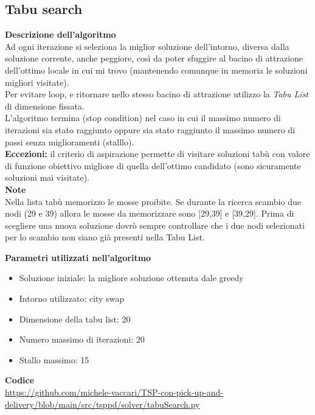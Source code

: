 \documentclass[9pt]{beamer}
\begin{document}
\subsection{Tabu search}
\begin{frame}{\subsecname}

	\textbf{Descrizione dell'algoritmo} \\
	Ad ogni iterazione si seleziona la miglior soluzione dell’intorno, diversa dalla soluzione corrente, anche peggiore, così da poter sfuggire al bacino di attrazione dell’ottimo locale in cui mi trovo (mantenendo comunque in memoria le soluzioni migliori visitate). \\
	Per evitare loop, e ritornare nello stesso bacino di attrazione utilizzo la \emph{Tabu List} di dimensione fissata. \\
	L’algoritmo termina (stop condition) nel caso in cui il massimo numero di iterazioni sia stato raggiunto oppure sia stato raggiunto il massimo numero di passi senza miglioramenti (stalllo). \\
	\textbf{Eccezioni:} il criterio di aspirazione permette di visitare soluzioni tabù con valore di funzione obiettivo migliore di quella dell’ottimo candidato (sono sicuramente soluzioni mai visitate). \\

\framebreak
	\textbf{Note} \\
	Nella lista tabù memorizzo le mosse proibite. Se durante la ricerca scambio due nodi (29 e 39) allora le mosse da memorizzare sono [29,39] e [39,29].
Prima di scegliere una nuova soluzione dovrò sempre controllare che i due nodi selezionati per lo scambio non siano già presenti nella Tabu List.

	\textbf{Parametri utilizzati nell'algoritmo}
	\begin{itemize}
		\item
		Soluzione iniziale: la migliore soluzione ottenuta dale greedy
		\item
		Intorno utilizzato: city swap
		\item
		Dimensione della tabu list: 20
		\item
		Numero massimo di iterazioni: 20
		\item
		Stallo massimo: 15
	\end{itemize}

	\textbf{Codice} \\
	\href{https://github.com/michele-vaccari/TSP-con-pick-up-and-delivery/blob/main/src/tsppd/solver/tabuSearch.py}{https://github.com/michele-vaccari/TSP-con-pick-up-and-delivery/blob/main/src/tsppd/solver/tabuSearch.py}


\end{frame}
\end{document}
